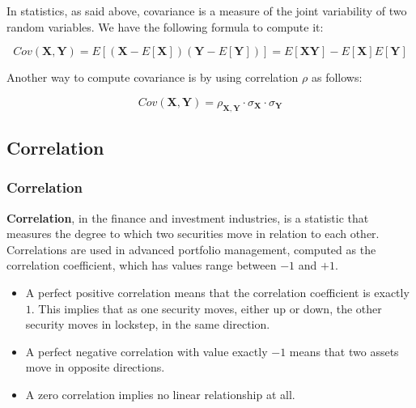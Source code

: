 \documentclass{beamer}
\begin{document}
\begin{frame}

\justifying
In statistics, as said above, covariance is a measure of the joint variability of two random variables. We have the following formula to compute it:

\begin{block}
\justifying
$$
Cov(\mathbf{X},\mathbf{Y}) = E[\left(\mathbf{X} - E[\mathbf{X}]\right)\left(\mathbf{Y} - E[\mathbf{Y}]\right)] = E[\mathbf{XY}] - E[\mathbf{X}]E[\mathbf{Y}]
$$
\end{block}

\vspace{1cm}
\justifying
Another way to compute covariance is by using correlation $\rho$ as follows:

\begin{block}
\justifying
$$
Cov(\mathbf{X},\mathbf{Y}) = \rho_{\mathbf{X},\mathbf{Y}}\cdot\sigma_{\mathbf{X}} \cdot \sigma_{\mathbf{Y}}
$$
\end{block}

\end{frame}







\subsection{Correlation}

\begin{frame}
\frametitle{\textbf{Correlation}}

\begin{definition}
\justifying
\textbf{Correlation}, in the finance and investment industries, is a statistic that measures the degree to which two securities move in relation to each other. Correlations are used in advanced portfolio management, computed as the correlation coefficient, which has values range between $-1$ and $+1$.
\end{definition}

\vspace{0.8cm}
\justifying
\begin{itemize}
	\justifying
	\item A perfect positive correlation means that the correlation coefficient is exactly $1$. This implies that as one security moves, either up or down, the other security moves in lockstep, in the same direction.
	\item A perfect negative correlation with value exactly $-1$ means that two assets move in opposite directions.
	\item A zero correlation implies no linear relationship at all.
\end{itemize}

\end{frame}
\end{document}
